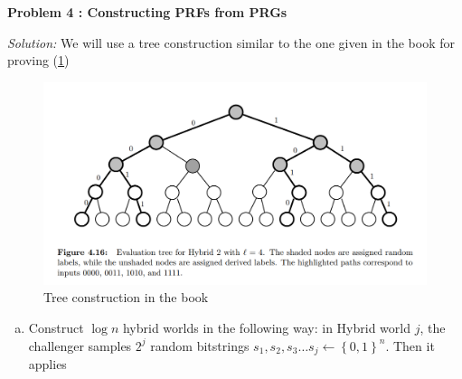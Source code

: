 \documentclass[a4paper, 11pt]{article}
\newenvironment{solution}
    {\textit{Solution:}}
    {\clearpage}
\newcommand{\prob}[1]{\begin{mdframed}[backgroundcolor=gray!20] \textbf{Problem #1}\end{mdframed}}
\newcommand{\bit}{\left\{0, 1\right\}}
\begin{document}
\prob{4 : Constructing PRFs from PRGs}
\begin{solution}
    We will use a tree construction similar to the one given in the book for proving (\cref{fig:TC})
    \begin{figure}[!ht]
        \centering
        \includegraphics[scale=0.5]{images/Tree Construction.png}
        \caption{Tree construction in the book}
        \label{fig:TC}
    \end{figure}
\begin{enumerate}[(a)]
    \item  Construct $\log n$ hybrid worlds in the following way: in Hybrid world $j$, the challenger samples $2^j$ random bitstrings $s_1, s_2,s_3\dots s_j \gets \bit^n$. Then it applies 
\end{enumerate}
\end{solution} 
\end{document}
